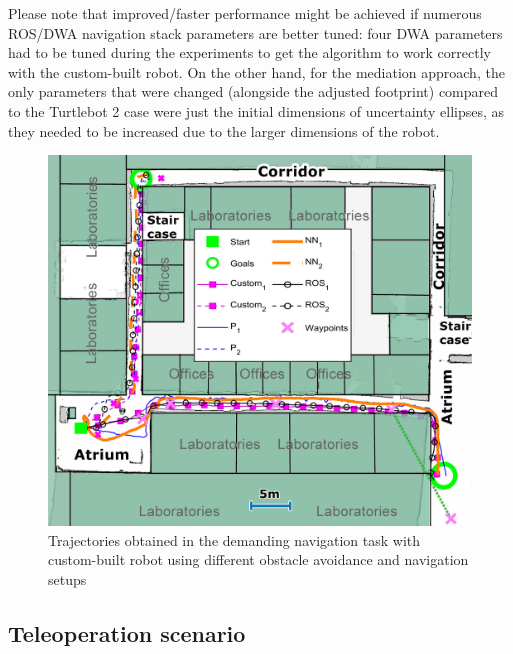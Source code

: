 Please note that improved/faster performance might be achieved if numerous ROS/DWA navigation stack parameters are better tuned: four DWA parameters had to be tuned during the experiments to get the algorithm to work correctly with the custom-built robot. On the other hand, for the mediation approach, the only parameters that were changed (alongside the adjusted footprint) compared to the Turtlebot 2 case were just the initial dimensions of uncertainty ellipses, as they needed to be increased due to the larger dimensions of the robot.

\begin{figure}
    \centering
    \includegraphics[width=0.85\columnwidth]{slike/Fig04_14.jpg}
    \caption{Trajectories obtained in the demanding navigation task with custom-built robot using different obstacle avoidance and navigation setups}
    \label{Fig:Trajektorije_hodnik2}
\end{figure}

\subsection{Teleoperation scenario} \label{sec:MediationTeleopResults}


